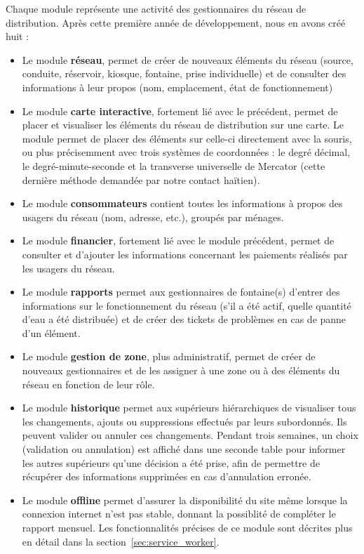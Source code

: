 \documentclass{EPL-master-thesis-covers-FR}
\begin{document}
			Chaque module représente une activité des gestionnaires du réseau de distribution. Après cette première année de développement, nous en avons créé huit :
			\begin{itemize}
				\item Le module \textbf{réseau}, permet de créer de nouveaux éléments du réseau (source, conduite, réservoir, kiosque, fontaine, prise individuelle) et de consulter des informations à leur propos (nom, emplacement, état de fonctionnement)
				\item Le module \textbf{carte interactive}, fortement lié avec le précédent, permet de placer et visualiser les éléments du réseau de distribution sur une carte. Le module permet de placer des éléments sur celle-ci directement avec la souris, ou plus précisemment avec trois systèmes de coordonnées : le degré décimal, le degré-minute-seconde et la transverse universelle de Mercator (cette dernière méthode demandée par notre contact haïtien).
				\item Le module \textbf{consommateurs} contient toutes les informations à propos des usagers du réseau (nom, adresse, etc.), groupés par ménages.
				\item Le module \textbf{financier}, fortement lié avec le module précédent, permet de consulter et d'ajouter les informations concernant les paiements réalisés par les usagers du réseau.
				\item Le module \textbf{rapports} permet aux gestionnaires de fontaine(s) d'entrer des informations sur le fonctionnement du réseau (s'il a été actif, quelle quantité d'eau a été distribuée) et de créer des tickets de problèmes en cas de panne d'un élément.
				\item Le module \textbf{gestion de zone}, plus administratif, permet de créer de nouveaux gestionnaires et de les assigner à une zone ou à des éléments du réseau en fonction de leur rôle.
				\item Le module \textbf{historique} permet aux supérieurs hiérarchiques de visualiser tous les changements, ajouts ou suppressions effectués par leurs subordonnés. Ils peuvent valider ou annuler ces changements. Pendant trois semaines, un choix (validation ou annulation) est affiché dans une seconde table pour informer les autres supérieurs qu'une décision a été prise, afin de permettre de récupérer des informations supprimées en cas d'annulation erronée.
				\item Le module \textbf{offline} permet d'assurer la disponibilité du site même lorsque la connexion internet n'est pas stable, donnant la possiblité de compléter le rapport mensuel. Les fonctionnalités précises de ce module sont décrites plus en détail dans la section~\ref{sec:service_worker}.
			\end{itemize}
\end{document}
